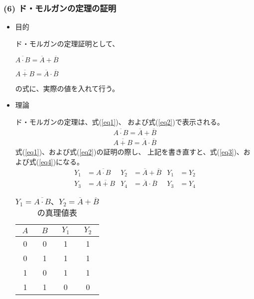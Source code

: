 \documentclass[12pt]{jarticle}
\begin{document}
\subsubsection*{(6) ド・モルガンの定理の証明}
\begin{itemize}
    \item 目的

          ド・モルガンの定理証明として、

          $ \overline{A \cdot B} = \overline{A} + \overline{B} $

          $\overline{A + B} = \overline{A} \cdot \overline{B}$

          の式に、実際の値を入れて行う。

    \item 理論

          ド・モルガンの定理は、式(\ref{eq1})、 および式(\ref{eq2})で表示される。
          \begin{eqnarray}
              \overline{A \cdot B} = \overline{A} + \overline{B} \label{eq1} \\
              \overline{A + B} = \overline{A} \cdot \overline{B} \label{eq2}
          \end{eqnarray}
          式(\ref{eq1})、および式(\ref{eq2})の証明の際し、
          上記を書き直すと、式(\ref{eq3})、および式(\ref{eq4})になる。
          \begin{align}
              Y_1 & = \overline{A \cdot B} & Y_2 & = \overline{A} + \overline{B}     & Y_1 & = Y_2 \label{eq3} \\
              Y_3 & = \overline{A + B}     & Y_4 & = \overline{A} \cdot \overline{B} & Y_3 & = Y_4 \label{eq4}
          \end{align}

          \clearpage

          \begin{table}[h]
              \caption{$Y_1= \overline{A \cdot B}、Y_2 = \overline{A} + \overline{B}$の真理値表}
              \begin{center}
                  \begin{tabular}{|c|c|c|c|}
                      \hline
                      $A$ & $B$ & $Y_1$ & $Y_2$ \\
                      \hline
                      0   & 0   & 1     & 1     \\
                      \hline
                      0   & 1   & 1     & 1     \\
                      \hline
                      1   & 0   & 1     & 1     \\
                      \hline
                      1   & 1   & 0     & 0     \\
                      \hline
                  \end{tabular}
              \end{center}
              \label{table6}
          \end{table}


\end{itemize}
\end{document}
